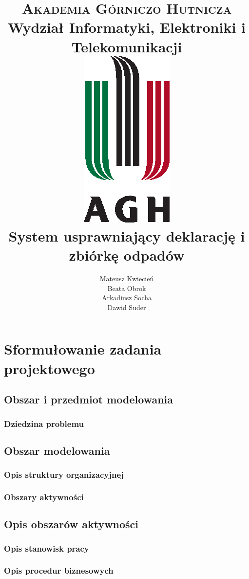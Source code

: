 \documentclass[paper=a4, fontsize=12pt]{scrartcl}
\title{
		\usefont{OT1}{bch}{b}{n}
		\normalfont \normalsize \textsc{Akademia Górniczo Hutnicza} \\ [25pt]
		Wydział Informatyki, Elektroniki i Telekomunikacji
		\horrule{0.5pt} \\[1cm]
		\includegraphics[width=.35\textwidth]{img/agh_znk_wbr_cmyk.eps} \\[1.5cm]
		\huge System usprawniający deklarację i zbiórkę odpadów
		\horrule{0.5pt} \\[0cm]
}
\author{
		\normalfont \normalsize
        Mateusz Kwiecień\\[-3pt]	\normalsize
        Beata Obrok\\[-3pt]			\normalsize
        Arkadiusz Socha\\[-3pt]		\normalsize
        Dawid Suder\\[-3pt]			\normalsize
}
\date{}
\numberwithin{equation}{section}		%
\numberwithin{figure}{section}			%
\numberwithin{table}{section}				%
\begin{document}
\maketitle
\tableofcontents

\section{Sformułowanie zadania projektowego}

	\subsection{Obszar i przedmiot modelowania}

		\subsubsection{Dziedzina problemu}
			

	\subsection{Obszar modelowania}

		\subsubsection{Opis struktury organizacyjnej}
			

		\subsubsection{Obszary aktywności}
			

	\subsection{Opis obszarów aktywności}

		\subsubsection{Opis stanowisk pracy}
			

		\subsubsection{Opis procedur biznesowych}
			
\end{document}

